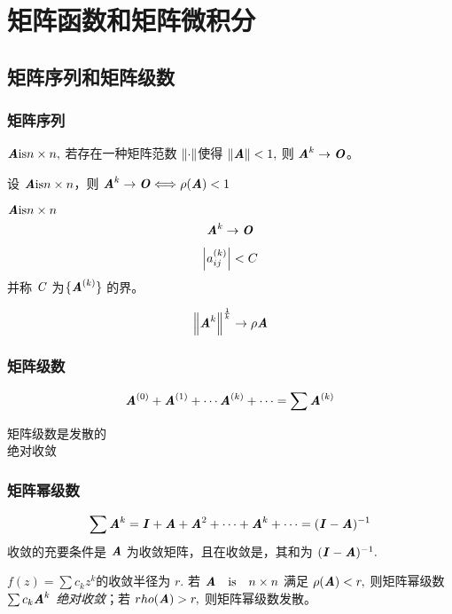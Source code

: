 \chapter{矩阵函数和矩阵微积分}
\label{cha:矩阵函数和矩阵微积分}


\section{矩阵序列和矩阵级数}
\label{sec:矩阵序列和矩阵级数}

\subsection{矩阵序列}
\label{sub:矩阵序列}
\begin{lemma} $\MA \text{is} n \times n,$ 若存在一种矩阵范数 $\norm{\cdot}$使得 $\norm{\MA} < 1,$ 则 $\MA^k \to \MO$。 \end{lemma} \begin{theorem} 设 $\MA \text{is} n \times n$，则 $\MA^k \to \MO \Longleftrightarrow \rho(\MA) < 1$ \end{theorem} \begin{definition}[收敛矩阵] $\MA \text{is} n \times n$ \\ \[ \MA^k \to \MO \] \end{definition} \begin{definition}[界] \[ \abs{a_{ij}^{(k)}} < C \] 并称 $\SC$ 为$\{ \MA^{(k)} \}$ 的界。 \end{definition} \begin{inference} \[ \norm{\MA^k}^{\frac 1k} \to \rho{\MA} \] \end{inference} 
\subsection{矩阵级数}
\label{sub:矩阵级数}
\begin{definition}[矩阵级数] \[ \MA^{(0)} + \MA^{(1)} + \cdots \MA^{(k)} + \cdots = \sum \MA^{(k)} \] \end{definition} \begin{definition} \begin{description} \item[矩阵级数是发散的] \item[绝对收敛] \end{description} \end{definition} 
\subsection{矩阵幂级数}
\label{sub:矩阵幂级数}
\begin{theorem}[幂级数] \[ \sum \MA^k = \MI + \MA +\MA^2 + \cdots + \MA^k + \cdots = (\MI - \MA)^{-1} \] 收敛的充要条件是 $\MA$ 为收敛矩阵，且在收敛是，其和为 $(\MI - \MA)^{-1}.$ \end{theorem} \begin{theorem} $f(z) = \sum c_k z^k$的收敛半径为 $r.$ 若 $\ann$ 满足 $\rho(\MA) < r,$ 则矩阵幂级数 $\sum c_k \MA^k$ \emph{绝对收敛}；若 $rho(\MA) > r,$ 则矩阵幂级数发散。 \end{theorem} 
